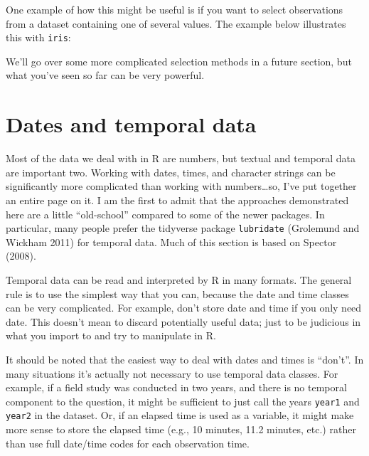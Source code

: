 \documentclass[
  13,
  letterpaper,
]{report}
\newenvironment{Shaded}{\begin{snugshade}}{\end{snugshade}}
\newcommand{\CommentTok}[1]{\textcolor[rgb]{0.37,0.37,0.37}{#1}}
\newcommand{\FunctionTok}[1]{\textcolor[rgb]{0.28,0.35,0.67}{#1}}
\newcommand{\NormalTok}[1]{\textcolor[rgb]{0.00,0.23,0.31}{#1}}
\newcommand{\SpecialCharTok}[1]{\textcolor[rgb]{0.37,0.37,0.37}{#1}}
\newcommand{\StringTok}[1]{\textcolor[rgb]{0.13,0.47,0.30}{#1}}
\begin{document}
One example of how this might be useful is if you want to select
observations from a dataset containing one of several values. The
example below illustrates this with \texttt{iris}:

\begin{Shaded}
\end{Shaded}

We'll go over some more complicated selection methods in a future
section, but what you've seen so far can be very powerful.

\section{Dates and temporal data}\label{sec-05-date}

Most of the data we deal with in R are numbers, but textual and temporal
data are important two. Working with dates, times, and character strings
can be significantly more complicated than working with
numbers\ldots so, I've put together an entire page on it. I am the first
to admit that the approaches demonstrated here are a little
``old-school'' compared to some of the newer packages. In particular,
many people prefer the tidyverse package \texttt{lubridate} (Grolemund
and Wickham 2011) for temporal data. Much of this section is based on
Spector (2008).

Temporal data can be read and interpreted by R in many formats. The
general rule is to use the simplest way that you can, because the date
and time classes can be very complicated. For example, don't store date
and time if you only need date. This doesn't mean to discard potentially
useful data; just to be judicious in what you import to and try to
manipulate in R.

It should be noted that the easiest way to deal with dates and times is
``don't''. In many situations it's actually not necessary to use
temporal data classes. For example, if a field study was conducted in
two years, and there is no temporal component to the question, it might
be sufficient to just call the years \texttt{year1} and \texttt{year2}
in the dataset. Or, if an elapsed time is used as a variable, it might
make more sense to store the elapsed time (e.g., 10 minutes, 11.2
minutes, etc.) rather than use full date/time codes for each observation
time.
\end{document}
